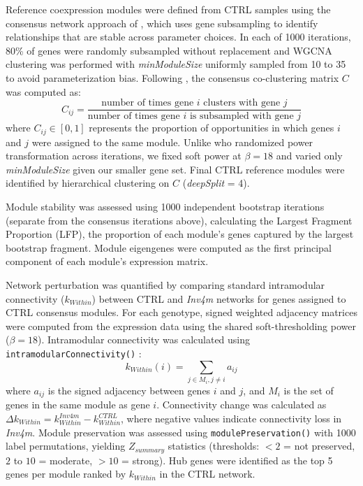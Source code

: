 \documentclass[9pt,twocolumn,twoside]{rilabRxiv}
\newcommand{\invfour}{\textit{Inv4m}\xspace}
\begin{document}
Reference coexpression modules were defined from CTRL samples using the consensus network approach of \cite{shahan2018}, which uses gene subsampling to identify relationships that are stable across parameter choices.
In each of 1000 iterations, 80\% of genes were randomly subsampled without replacement and WGCNA clustering was performed with \textit{minModuleSize} uniformly sampled from 10 to 35 to avoid parameterization bias.
Following \cite{shahan2018}, the consensus co-clustering matrix $C$ was computed as:
\begin{equation}
C_{ij} = \frac{\text{number of times gene } i \text{ clusters with gene } j}{\text{number of times gene } i \text{ is subsampled with gene } j}
\end{equation}
where $C_{ij} \in [0,1]$ represents the proportion of opportunities in which genes $i$ and $j$ were assigned to the same module.
Unlike \cite{shahan2018} who randomized power transformation across iterations, we fixed soft power at $\beta = 18$ and varied only \textit{minModuleSize} given our smaller gene set.
Final CTRL reference modules were identified by hierarchical clustering on $C$ (\textit{deepSplit} = 4).

Module stability was assessed using 1000 independent bootstrap iterations (separate from the consensus iterations above), calculating the Largest Fragment Proportion (LFP), the proportion of each module's genes captured by the largest bootstrap fragment.
Module eigengenes were computed as the first principal component of each module's expression matrix.

Network perturbation was quantified by comparing standard intramodular connectivity ($k_{Within}$) between CTRL and \invfour networks for genes assigned to CTRL consensus modules.
For each genotype, signed weighted adjacency matrices were computed from the expression data using the shared soft-thresholding power ($\beta = 18$).
Intramodular connectivity was calculated using \texttt{intramodularConnectivity()} \cite{langfelder2008}:
\begin{equation}
k_{Within}(i) = \sum_{j \in M_i, j \neq i} a_{ij}
\end{equation}
where $a_{ij}$ is the signed adjacency between genes $i$ and $j$, and $M_i$ is the set of genes in the same module as gene $i$.
Connectivity change was calculated as $\Delta k_{Within} = k_{Within}^{Inv4m} - k_{Within}^{CTRL}$, where negative values indicate connectivity loss in \invfour.
Module preservation was assessed using \texttt{modulePreservation()} \cite{langfelder2011} with 1000 label permutations, yielding $Z_{summary}$ statistics (thresholds: $< 2$ = not preserved, $2$ to $10$ = moderate, $> 10$ = strong).
Hub genes were identified as the top 5 genes per module ranked by $k_{Within}$ in the CTRL network.
\end{document}
